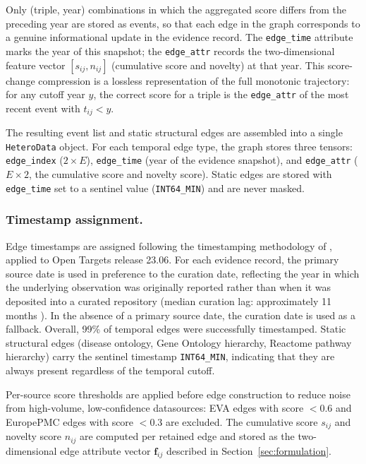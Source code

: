 \documentclass[a4,center]{NAR}
\begin{document}
{Only (triple, year) combinations in which the aggregated score differs from
the preceding year are stored as events, so that each edge in the graph
corresponds to a genuine informational update in the evidence record. The
\texttt{edge\_time} attribute marks the year of this snapshot; the
\texttt{edge\_attr} records the two-dimensional feature vector
$[s_{ij}, n_{ij}]$ (cumulative score and novelty) at that year. This
score-change compression is a
lossless representation of the full monotonic trajectory: for any cutoff
year $y$, the correct score for a triple is the \texttt{edge\_attr} of the
most recent event with $t_{ij} < y$.

The resulting event list and static structural edges are assembled into a
single \texttt{HeteroData} object. For each temporal edge type, the graph
stores three tensors: \texttt{edge\_index} ($2 \times E$),
\texttt{edge\_time} (year of the evidence snapshot), and
\texttt{edge\_attr} ($E \times 2$, the cumulative score and novelty
score). Static edges are stored with \texttt{edge\_time}
set to a sentinel value (\texttt{INT64\_MIN}) and are never masked.


\subsubsection{Timestamp assignment.}

Edge timestamps are assigned following the timestamping methodology of
\citet{Falaguera2025TemporalDiscovery}, applied to Open Targets release 23.06. For each
evidence record, the primary source date is used in preference to the
curation date, reflecting the year in which the underlying observation was
originally reported rather than when it was deposited into a curated
repository (median curation lag: approximately 11 months
\citep{Falaguera2025TemporalDiscovery}). In the absence of a primary source date, the
curation date is used as a fallback. Overall, 99\% of temporal edges were
successfully timestamped. Static structural edges (disease ontology,
Gene Ontology hierarchy, Reactome pathway hierarchy) carry the sentinel
timestamp \texttt{INT64\_MIN}, indicating that they are always present
regardless of the temporal cutoff.

Per-source score thresholds are applied before edge construction to reduce
noise from high-volume, low-confidence datasources: EVA edges with score
$< 0.6$ and EuropePMC edges with score $< 0.3$ are excluded. The cumulative
score $s_{ij}$ and novelty score $n_{ij}$ are computed per retained
edge and stored as the two-dimensional edge attribute vector
$\mathbf{f}_{ij}$ described in Section~\ref{sec:formulation}.


}
\end{document}
